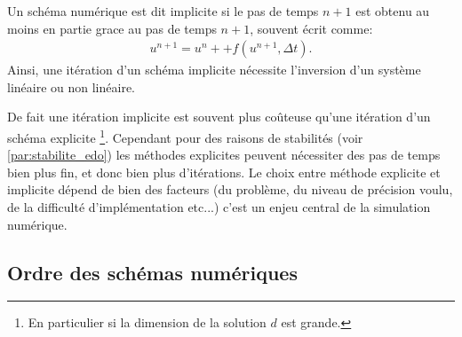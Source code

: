 \begin{definition}
    Un schéma numérique est dit implicite si le pas de temps $n+1$ est obtenu au moins en partie grace au pas de temps $n+1$, souvent écrit comme:
    \begin{align}
        u^{n+1} = u^n + + f(u^{n+1} ,\Delta t ).
    \end{align}
    Ainsi, une itération d'un schéma implicite nécessite l'inversion d'un système linéaire ou non linéaire. 
\end{definition}
De fait une itération implicite est souvent plus coûteuse qu'une itération d'un schéma explicite
\footnote{En particulier si la dimension de la solution $d$ est grande.}. 
Cependant pour des raisons de stabilités (voir \ref{par:stabilite_edo}) les méthodes explicites peuvent nécessiter des pas de temps bien plus fin, et donc bien plus d'itérations.
Le choix entre méthode explicite et implicite dépend de bien des facteurs (du problème, du niveau de précision voulu, de la difficulté d'implémentation etc...)
c'est un enjeu central de la simulation numérique.
\subsection{Ordre des schémas numériques}

